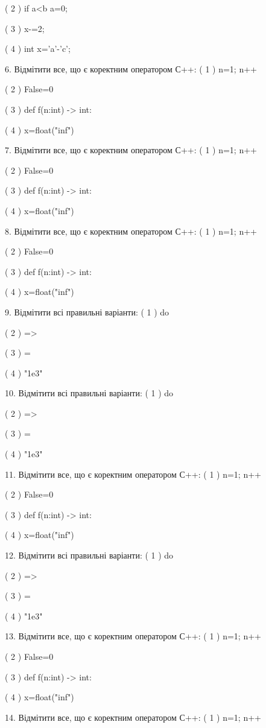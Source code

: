 \documentclass[11pt]{article}
\begin{document}
( 2 ) if a<b a=0;

( 3 ) x-=2;

( 4 ) int x='a'-'c';

6. Відмітити все, що є коректним оператором С++:
( 1 ) n=1; n++

( 2 ) False=0

( 3 ) def f(n:int) -> int:

( 4 ) x=float("inf")

7. Відмітити все, що є коректним оператором С++:
( 1 ) n=1; n++

( 2 ) False=0

( 3 ) def f(n:int) -> int:

( 4 ) x=float("inf")

8. Відмітити все, що є коректним оператором С++:
( 1 ) n=1; n++

( 2 ) False=0

( 3 ) def f(n:int) -> int:

( 4 ) x=float("inf")

9. Відмітити всі правильні варіанти:
( 1 ) do

( 2 ) =>

( 3 ) =

( 4 ) "1e3"

10. Відмітити всі правильні варіанти:
( 1 ) do

( 2 ) =>

( 3 ) =

( 4 ) "1e3"

11. Відмітити все, що є коректним оператором С++:
( 1 ) n=1; n++

( 2 ) False=0

( 3 ) def f(n:int) -> int:

( 4 ) x=float("inf")

12. Відмітити всі правильні варіанти:
( 1 ) do

( 2 ) =>

( 3 ) =

( 4 ) "1e3"

13. Відмітити все, що є коректним оператором С++:
( 1 ) n=1; n++

( 2 ) False=0

( 3 ) def f(n:int) -> int:

( 4 ) x=float("inf")

14. Відмітити все, що є коректним оператором С++:
( 1 ) n=1; n++
\end{document}
